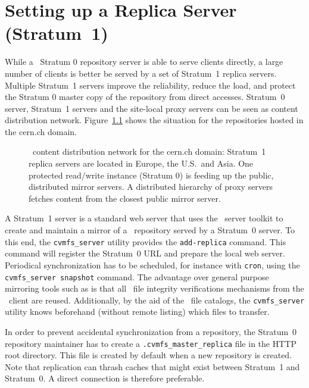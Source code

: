 \chapter{Setting up a Replica Server (Stratum~1)}
\label{sct:replica}

While a \cvmfs\ Stratum 0 repository server is able to serve clients directly, a large number of clients is better be served by a set of Stratum~1 replica servers.
Multiple Stratum~1 servers improve the reliability, reduce the load, and protect the Stratum 0 master copy of the repository from direct accesses.
Stratum~0 server, Stratum~1 servers and the site-local proxy servers can be seen as content distribution network.
Figure~\ref{fig:stratum1} shows the situation for the repositories hosted in the cern.ch domain.

\begin{figure}
	\begin{center}
		\resizebox{\textwidth}{!}{}
	\end{center}
	\caption{\cvmfs\ content distribution network for the cern.ch domain: Stratum~1 replica servers are located in Europe, the U.S.\ and Asia.  
		One protected read/write instance (Stratum 0) is feeding up the public, distributed mirror servers. 
		A distributed hierarchy of proxy servers fetches content from the closest public mirror server.}
	\label{fig:stratum1}
\end{figure}

A Stratum~1 server is a standard web server that uses the \cvmfs\ server toolkit to create and maintain a mirror of a \cvmfs\ repository served by a Stratum~0 server.
To this end, the \texttt{cvmfs\_server} utility provides the \texttt{add-replica} command.
This command will register the Stratum~0 URL and prepare the local web server.
Periodical synchronization has to be scheduled, for instance with \texttt{cron}, using the \texttt{cvmfs\_server snapshot} command.
The advantage over general purpose mirroring tools such as  is that all \cvmfs\ file integrity verifications mechanisms from the \fuse\ client are reused.
Additionally, by the aid of the \cvmfs\ file catalogs, the \texttt{cvmfs\_server} utility knows beforehand (without remote listing) which files to transfer.

In order to prevent accidental synchronization from a repository, the Stratum~0 repository maintainer has to create a \texttt{.cvmfs\_master\_replica} file in the HTTP root directory.
This file is created by default when a new repository is created.
Note that replication can thrash caches that might exist between Stratum~1 and Stratum~0.
A direct connection is therefore preferable.

